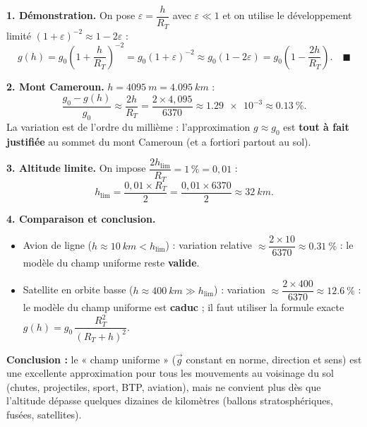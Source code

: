 \documentclass[11pt]{article}
\begin{document}
\begin{corrige}
\textbf{1. Démonstration.} On pose $\varepsilon = \dfrac{h}{R_T}$ avec $\varepsilon \ll 1$ et on utilise le développement limité $(1+\varepsilon)^{-2} \approx 1 - 2\varepsilon$ :
\[
g(h) = g_0\left(1+\frac{h}{R_T}\right)^{-2} = g_0(1+\varepsilon)^{-2} \approx g_0(1-2\varepsilon) = g_0\left(1-\frac{2h}{R_T}\right). \quad \blacksquare
\]

\textbf{2. Mont Cameroun.} $h = \SI{4095}{m} = \SI{4,095}{km}$ :
\[
\frac{g_0-g(h)}{g_0} \approx \frac{2h}{R_T} = \frac{2\times 4,095}{6370} \approx \num{1,29e-3} \approx \SI{0,13}{\%}.
\]
La variation est de l'ordre du millième : l'approximation $g \approx g_0$ est \textbf{tout à fait justifiée} au sommet du mont Cameroun (et a fortiori partout au sol).

\textbf{3. Altitude limite.} On impose $\dfrac{2h_{\text{lim}}}{R_T} = 1\,\% = 0,01$ :
\[
h_{\text{lim}} = \frac{0,01\times R_T}{2} = \frac{0,01\times 6370}{2} \approx \SI{32}{km}.
\]

\textbf{4. Comparaison et conclusion.}
\begin{itemize}
\item Avion de ligne ($h \approx \SI{10}{km} < h_{\text{lim}}$) : variation relative $\approx \dfrac{2\times 10}{6370} \approx \SI{0,31}{\%}$ : le modèle du champ uniforme reste \textbf{valide}.
\item Satellite en orbite basse ($h \approx \SI{400}{km} \gg h_{\text{lim}}$) : variation $\approx \dfrac{2\times 400}{6370} \approx \SI{12,6}{\%}$ : le modèle du champ uniforme est \textbf{caduc} ; il faut utiliser la formule exacte $g(h) = g_0\,\dfrac{R_T^2}{(R_T+h)^2}$.
\end{itemize}
\textbf{Conclusion :} le « champ uniforme » ($\vec{g}$ constant en norme, direction et sens) est une excellente approximation pour tous les mouvements au voisinage du sol (chutes, projectiles, sport, BTP, aviation), mais ne convient plus dès que l'altitude dépasse quelques dizaines de kilomètres (ballons stratosphériques, fusées, satellites).
\end{corrige}
\end{document}
